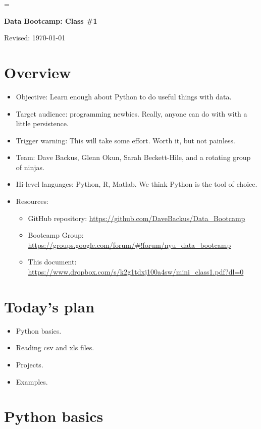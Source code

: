 \documentclass[11pt]{article}
\begin{document}
\parskip=\bigskipamount
\parindent=0.0in
\thispagestyle{empty}


\bigskip\bigskip
\centerline{\Large \bf Data Bootcamp:  Class \#1}
\centerline{Revised: \today}


\section{Overview}

\begin{itemize}
\item Objective:  Learn enough about Python to do useful things with data.
\item Target audience:  programming newbies.  Really,
anyone can do with with a little persistence.
\item Trigger warning:  This will take some effort.  Worth it, but not painless.
\item Team:  Dave Backus, Glenn Okun, Sarah Beckett-Hile, and a rotating group of ninjas.
\item Hi-level languages:  Python, R, Matlab.  We think Python is the tool of choice.  
\item Resources:
\begin{itemize}
\item GitHub repository:  \url{https://github.com/DaveBackus/Data_Bootcamp}
\item Bootcamp Group:  \url{https://groups.google.com/forum/#!forum/nyu_data_bootcamp}
\item This document:  \url{https://www.dropbox.com/s/k2g1tdxj100a4sw/mini_class1.pdf?dl=0}
\end{itemize}
\end{itemize}

\section{Today's plan}

\begin{itemize}
\item Python basics.
\item Reading csv and xls files.
\item Projects.
\item Examples.
\end{itemize}

\section{Python basics}
\end{document}
